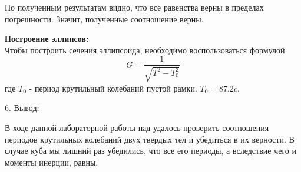 \documentclass[12pt, a4paper]{article}
\begin{document}
			По полученным результатам видно, что все равенства верны в пределах погрешности. 
			Значит, полученные соотношение верны.


			\textbf{Построение эллипсов:} \\
			Чтобы построить сечения эллипсоида, необходимо воспользоваться формулой
			\begin{displaymath}
				G = \frac{1}{\sqrt{T^2 - T_0^2}}
			\end{displaymath}
			где $T_0$ - период крутильный колебаний пустой рамки. $T_0 = 87.2c$.

			\vspace{1cm}
			{\Large 6. Вывод:}


			В ходе данной лабораторной работы над удалось проверить соотношения
			периодов крутильных колебаний двух твердых тел и убедиться в их верности.
			В случае куба мы лишний раз убедились, что все его периоды, а вследствие чего
			и моменты инерции, равны.

			
\end{document}
